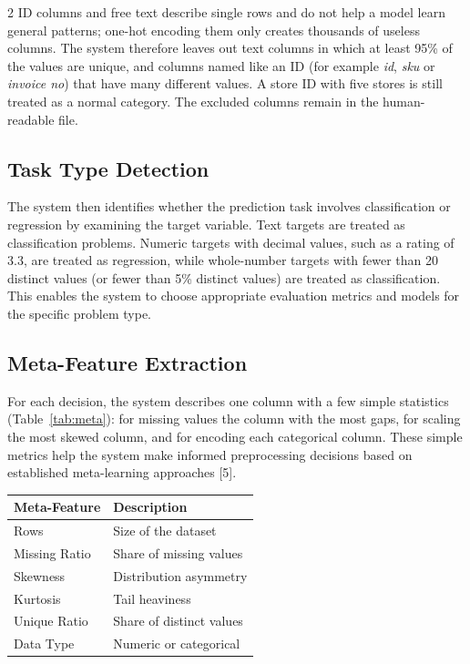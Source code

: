 \documentclass[11pt,a4paper]{article}
\newenvironment{coltable}{\par\medskip\noindent\begin{minipage}{\linewidth}\centering\small}{\end{minipage}\par\medskip}
\begin{document}
\begin{multicols}{2}
ID columns and free text describe single rows and do not help a model learn general patterns; one-hot encoding them only creates thousands of useless columns. The system therefore leaves out text columns in which at least 95\% of the values are unique, and columns named like an ID (for example \emph{id}, \emph{sku} or \emph{invoice no}) that have many different values. A store ID with five stores is still treated as a normal category. The excluded columns remain in the human-readable file.

\subsection{Task Type Detection}

The system then identifies whether the prediction task involves classification or regression by examining the target variable. Text targets are treated as classification problems. Numeric targets with decimal values, such as a rating of 3.3, are treated as regression, while whole-number targets with fewer than 20 distinct values (or fewer than 5\% distinct values) are treated as classification. This enables the system to choose appropriate evaluation metrics and models for the specific problem type.

\subsection{Meta-Feature Extraction}

For each decision, the system describes one column with a few simple statistics (Table~\ref{tab:meta}): for missing values the column with the most gaps, for scaling the most skewed column, and for encoding each categorical column. These simple metrics help the system make informed preprocessing decisions based on established meta-learning approaches [5].

\begin{coltable}
\label{tab:meta}
\begin{tabular}{ll}
\toprule
\textbf{Meta-Feature} & \textbf{Description} \\
\midrule
Rows & Size of the dataset \\
Missing Ratio & Share of missing values \\
Skewness & Distribution asymmetry \\
Kurtosis & Tail heaviness \\
Unique Ratio & Share of distinct values \\
Data Type & Numeric or categorical \\
\bottomrule
\end{tabular}
\end{coltable}


\end{multicols}
\end{document}

